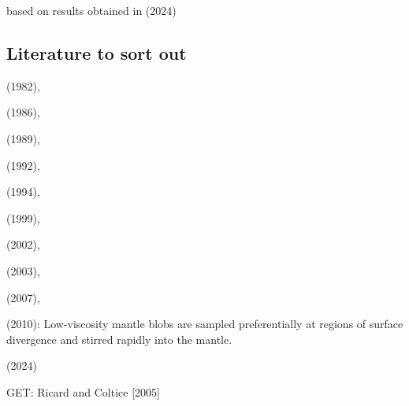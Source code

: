 based on results obtained in \textcite{vavt24} (2024)


\subsection{Literature to sort out}


\textcite{ridn82} (1982),

\textcite{gurn86} (1986),

\textcite{chri89} (1989),

\textcite{hayk92} (1992),

\textcite{scha94} (1994),

\textcite{vazh99} (1999),

\textcite{falt02} (2002),

\textcite{fasa03} (2003),

\textcite{huda07b} (2007),

\textcite{mang10} (2010): Low-viscosity mantle blobs are sampled preferentially at regions of surface
divergence and stirred rapidly into the mantle.

\textcite{thsf24} (2024)

GET: Ricard and Coltice [2005]



